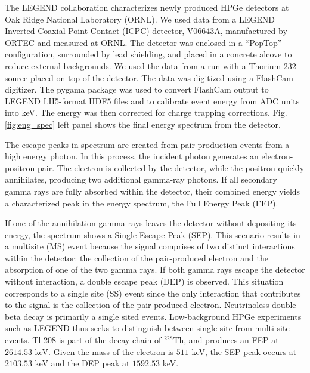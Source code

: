 The LEGEND collaboration characterizes newly produced HPGe detectors at Oak Ridge National Laboratory (ORNL). We used data from a LEGEND Inverted-Coaxial Point-Contact (ICPC) detector, V06643A, manufactured by ORTEC and measured at ORNL. The detector was enclosed in a “PopTop” configuration, surrounded by lead shielding, and placed in a concrete alcove to reduce external backgrounds. We used the data from a run with a Thorium-232 source placed on top of the detector. The data was digitized using a FlashCam digitizer. The pygama package was used to convert FlashCam output to LEGEND LH5-format HDF5 files and to calibrate event energy from ADC units into keV\cite{pygama}. The energy was then corrected for charge trapping corrections. Fig. \ref{fig:eng_spec} left panel shows the final energy spectrum from the detector. 


The escape peaks in spectrum are created from pair production events from a high energy photon. In this process, the incident photon generates an electron-positron pair. The electron is collected by the detector, while the positron quickly annihilates, producing two additional gamma-ray photons. If all secondary gamma rays are fully absorbed within the detector, their combined energy yields a characterized peak in the energy spectrum, the Full Energy Peak (FEP).

If one of the annihilation gamma rays leaves the detector without depositing its energy, the spectrum shows a Single Escape Peak (SEP). This scenario results in a multisite (MS) event because the signal comprises of two distinct interactions within the detector: the collection of the pair-produced electron and the absorption of one of the two gamma rays. If both gamma rays escape the detector without interaction, a double escape peak (DEP) is observed. This situation corresponds to a single site (SS) event since the only interaction that contributes to the signal is the collection of the pair-produced electron. Neutrinoless double-beta decay is primarily a single sited events. Low-background HPGe experiments such as LEGEND thus seeks to distinguish between single site from multi site events. Tl-208 is part of the decay chain of $^{228}$Th, and produces an FEP at $2614.53$ keV. Given the mass of the electron is $511$ keV, the SEP peak occurs at $2103.53$ keV and the DEP peak at $1592.53$ keV. 




